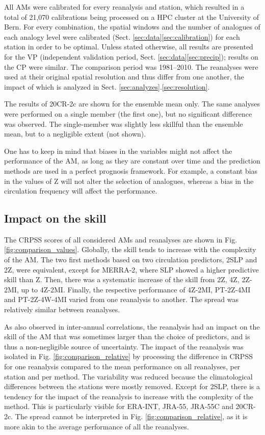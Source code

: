 \documentclass[smallextended]{svjour3}       %
\begin{document}
	All AMs were calibrated for every reanalysis and station, which resulted in a total of 21,070 calibrations being processed on a HPC cluster at the University of Bern. For every combination, the spatial windows and the number of analogues of each analogy level were calibrated (Sect. \ref{sec:data}\ref{sec:calibration}) for each station in order to be optimal. Unless stated otherwise, all results are presented for the VP (independent validation period, Sect. \ref{sec:data}\ref{sec:precip}); results on the CP were similar. The comparison period was 1981--2010. The reanalyses were used at their original spatial resolution and thus differ from one another, the impact of which is analyzed in Sect. \ref{sec:analyzes}.\ref{sec:resolution}.
	
	The results of 20CR-2c are shown for the ensemble mean only. The same analyses were performed on a single member (the first one), but no significant difference was observed. The single-member was slightly less skillful than the ensemble mean, but to a negligible extent (not shown).
	
	One has to keep in mind that biases in the variables might not affect the performance of the AM, as long as they are constant over time and the prediction methods are used in a perfect prognosis framework. For example, a constant bias in the values of Z will not alter the selection of analogues, whereas a bias in the circulation frequency will affect the performance.
	
	
	\subsection{Impact on the skill}
	
	The CRPSS scores of all considered AMs and reanalyses are shown in Fig. \ref{fig:comparison_values}. Globally, the skill tends to increase with the complexity of the AM. The two first methods based on two circulation predictors, 2SLP and 2Z, were equivalent, except for MERRA-2, where SLP showed a higher predictive skill than Z. Then, there was a systematic increase of the skill from 2Z, 4Z, 2Z-2MI, up to 4Z-2MI. Finally, the respective performance of 4Z-2MI, PT-2Z-4MI and PT-2Z-4W-4MI varied from one reanalysis to another. The spread was relatively similar between reanalyses.
	
	As \citet{Dayon2015} also observed in inter-annual correlations, the reanalysis had an impact on the skill of the AM that was sometimes larger than the choice of predictors, and is thus a non-negligible source of uncertainty. The impact of the reanalysis was isolated in Fig. \ref{fig:comparison_relative} by processing the difference in CRPSS for one reanalysis compared to the mean performance on all reanalyses, per station and per method. The variability was reduced because the climatological differences between the stations were mostly removed. Except for 2SLP, there is a tendency for the impact of the reanalysis to increase with the complexity of the method. This is particularly visible for ERA-INT, JRA-55, JRA-55C and 20CR-2c. The spread cannot be interpreted in Fig. \ref{fig:comparison_relative}, as it is more akin to the average performance of all the reanalyses.
	
\end{document}
